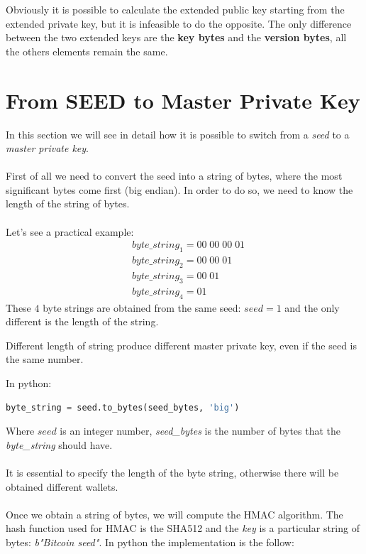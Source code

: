 \begin{remark}
	Obviously it is possible to calculate the extended public key starting from the extended private key, but it is infeasible to do the opposite. The only difference between the two extended keys are the \textbf{key bytes} and the \textbf{version bytes}, all the others elements remain the same.
\end{remark}

\section{From SEED to Master Private Key}
In this section we will see in detail how it is possible to switch from a \textit{seed} to a \textit{master private key}. \\ \\
First of all we need to convert the seed into a string of bytes, where the most significant bytes come first (big endian). In order to do so, we need to know the length of the string of bytes. \\ \\
Let's see a practical example:
\begin{equation*}
\begin{split}
&byte\_string_1=00\; 00\; 00 \; 01 \\
&byte\_string_2=00\; 00\; 01 \\
&byte\_string_3=00\; 01 \\
&byte\_string_4=01
\end{split}
\end{equation*}
These $4$ byte strings are obtained from the same seed: $seed=1$ and the only different is the length of the string.
\begin{remark}
	Different length of string produce different master private key, even if the seed is the same number.
\end{remark}
In python:
\begin{lstlisting}[language=Python]
byte_string = seed.to_bytes(seed_bytes, 'big')
\end{lstlisting}
Where $seed$ is an integer number, \textit{seed\_bytes} is the number of bytes that the \textit{byte\_string} should have. 
\\ \\
It is essential to specify the length of the byte string, otherwise there will be obtained different wallets. \\ \\
Once we obtain a string of bytes, we will compute the HMAC algorithm. The hash function used for HMAC is the SHA512 and the \textit{key} is a particular string of bytes: \textit{b"Bitcoin seed"}. In python the implementation is the follow:

